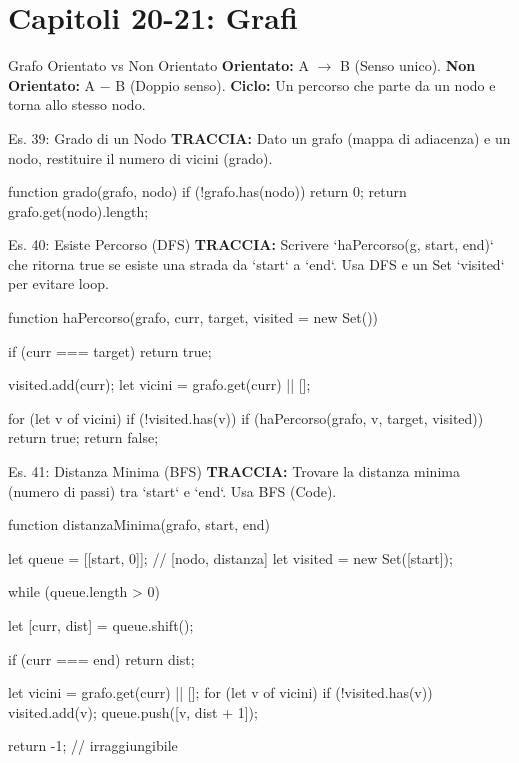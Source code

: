\section{Capitoli 20-21: Grafi}

\begin{dizionario}{Grafo Orientato vs Non Orientato}
\textbf{Orientato:} A $\to$ B (Senso unico).
\textbf{Non Orientato:} A $-$ B (Doppio senso).
\textbf{Ciclo:} Un percorso che parte da un nodo e torna allo stesso nodo.
\end{dizionario}

\begin{esercizio}{Es. 39: Grado di un Nodo}
\textbf{TRACCIA:} Dato un grafo (mappa di adiacenza) e un nodo, restituire il numero di vicini (grado).
\end{esercizio}

\begin{jsbox}
function grado(grafo, nodo) {
    if (!grafo.has(nodo)) return 0;
    return grafo.get(nodo).length;
}
\end{jsbox}

\begin{esercizio}{Es. 40: Esiste Percorso (DFS)}
\textbf{TRACCIA:} Scrivere `haPercorso(g, start, end)` che ritorna true se esiste una strada da `start` a `end`.
Usa DFS e un Set `visited` per evitare loop.
\end{esercizio}

\begin{jsbox}
function haPercorso(grafo, curr, target, visited = new Set()) {
    if (curr === target) return true;
    
    visited.add(curr);
    let vicini = grafo.get(curr) || [];
    
    for (let v of vicini) {
        if (!visited.has(v)) {
            if (haPercorso(grafo, v, target, visited)) return true;
        }
    }
    return false;
}
\end{jsbox}

\begin{esercizio}{Es. 41: Distanza Minima (BFS)}
\textbf{TRACCIA:} Trovare la distanza minima (numero di passi) tra `start` e `end`.
Usa BFS (Code).
\end{esercizio}

\begin{jsbox}
function distanzaMinima(grafo, start, end) {
    let queue = [[start, 0]]; // [nodo, distanza]
    let visited = new Set([start]);
    
    while (queue.length > 0) {
        let [curr, dist] = queue.shift();
        
        if (curr === end) return dist;
        
        let vicini = grafo.get(curr) || [];
        for (let v of vicini) {
            if (!visited.has(v)) {
                visited.add(v);
                queue.push([v, dist + 1]);
            }
        }
    }
    return -1; // irraggiungibile
}
\end{jsbox}
